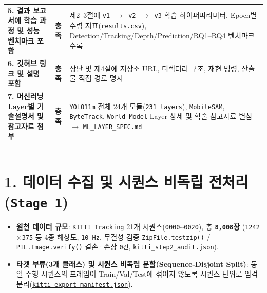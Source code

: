 \documentclass[10.5pt,a4paper]{article}
\begin{document}
\begin{footnotesize}
\begin{longtable}{>{\raggedright\arraybackslash}p{} >{\raggedright\arraybackslash}p{} >{\raggedright\arraybackslash}p{}}
\textbf{5. 결과 보고서에 학습 과정 및 성능 벤치마크 포함} & \textbf{충족} & 제2--3절에 \texttt{v1 $\rightarrow$ v2 $\rightarrow$ v3} 학습 하이퍼파라미터, Epoch별 수렴 지표(\texttt{results.\allowbreak{}csv}), Detection/Tracking/Depth/Prediction/RQ1--RQ4 벤치마크 수록 \\
\textbf{6. 깃허브 링크 및 설명 포함} & \textbf{충족} & 상단 및 제4절에 저장소 URL, 디렉터리 구조, 재현 명령, 산출물 직접 경로 명시 \\
\textbf{7. 머신러닝 Layer별 기술설명서 및 참고자료 첨부} & \textbf{충족} & \texttt{YOLO11m} 전체 24개 모듈(\texttt{231 layers}), \texttt{MobileSAM}, \texttt{ByteTrack}, \texttt{World Model} Layer 상세 및 학술 참고자료 별첨 $\rightarrow$ \href{https://github.com/Heisnotanimposter/Totalcare\_autonomous\_driving\_Yolov5/blob/main/ML\_LAYER\_SPEC.md}{\texttt{ML\_\allowbreak{}LAYER\_\allowbreak{}SPEC.\allowbreak{}md}} \\
\end{longtable}
\end{footnotesize}


\par\noindent\rule{\textwidth}{0.4pt}\par\medskip

\section{1. 데이터 수집 및 시퀀스 비독립 전처리 (\texttt{Stage 1})}

\begin{itemize}[leftmargin=1.5em,itemsep=2pt]
\item \textbf{원천 데이터 규모}: \texttt{KITTI Tracking} 21개 시퀀스(\texttt{0000}\textasciitilde{}\texttt{0020}), 총 \textbf{\texttt{8,\allowbreak{}008}장} (\texttt{1242$\times$375} 등 4종 해상도, \texttt{10 Hz}, 무결성 검증 \texttt{ZipFile.\allowbreak{}testzip()} / \texttt{PIL.\allowbreak{}Image.\allowbreak{}verify()} 결손·손상 \texttt{0건}, \href{https://github.com/Heisnotanimposter/Totalcare\_autonomous\_driving\_Yolov5/blob/main/results/v2\_improved/outputs/kitti\_step2\_audit.json}{\texttt{kitti\_\allowbreak{}step2\_\allowbreak{}audit.\allowbreak{}json}}).
\item \textbf{타겟 부류(3개 클래스) 및 시퀀스 비독립 분할(Sequence-Disjoint Split)}: 동일 주행 시퀀스의 프레임이 Train/Val/Test에 섞이지 않도록 시퀀스 단위로 엄격 분리(\href{https://github.com/Heisnotanimposter/Totalcare\_autonomous\_driving\_Yolov5/blob/main/results/v2\_improved/outputs/kitti\_export\_manifest.json}{\texttt{kitti\_\allowbreak{}export\_\allowbreak{}manifest.\allowbreak{}json}}).
\end{itemize}
\end{document}
